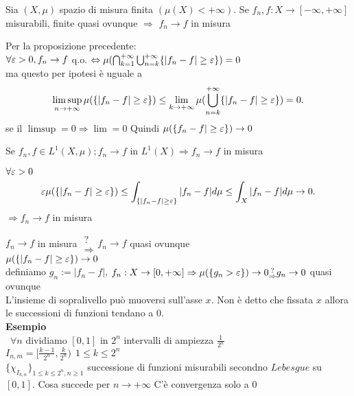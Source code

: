 \documentclass[12px]{article}
\begin{document}
		\begin{prop}
			Sia $(X,\mu)$ spazio di misura finita $(\mu(X) < +\infty)$. Se $f_n, f : X \rightarrow [-\infty, + \infty]$ misurabili, finite quasi ovunque $ \Rightarrow $ $f_n \rightarrow f$ in misura
		\end{prop}
		\begin{dimo}
			Per la proposizione precedente:\\ $\forall \varepsilon > 0 , f_n \rightarrow f$ q.o. $ \Leftrightarrow \mu( \bigcap^{+\infty}_{k = 1} \bigcup^{+\infty}_{n = k}\{|f_n-f|\geq\varepsilon\}) = 0$\\
			ma questo per ipotesi è uguale a
			\[
				\limsup_{n \rightarrow +\infty}\mu(\{|f_n-f|\geq\varepsilon\})\leq\lim_{ k \rightarrow+\infty }\mu( \bigcup^{+\infty}_{n = k} \{|f_n-f|\geq \varepsilon\}) = 0
			.\]  
			se il $\limsup = 0 \Rightarrow  \lim = 0$  Quindi $\mu(\{f_n-f|\geq \varepsilon\}) \rightarrow 0 $
		\end{dimo}
		\begin{prop}
			Se $f_n, f \in L^1(X,\mu); f_n \rightarrow f$ in $L^1(X) \Rightarrow  f_n \rightarrow f$ in misura
		\end{prop}
		\begin{dimo}
			$\forall \varepsilon > 0$
			\[
				
				\e\mu(\{|f_n-f|\geq\e\})\leq\int_{\{|f_n-f|\geq\e\}}|f_n-f|d\mu\leq\int_X|f_n-f| d\mu \rightarrow 0
			.\]
			$ \Rightarrow  f_n \rightarrow f$ in misura
		\end{dimo}
		$f_n \rightarrow f$ in misura $\substack{?\\ \Rightarrow }f_n \rightarrow f$ quasi ovunque\\
		$\mu(\{|f_n-f|\geq\varepsilon\}) \rightarrow 0$ \\
		definiamo $g_n := |f_n-f|$,  $f_n : X \rightarrow [0,+\infty] \Rightarrow \mu(\{g_n > \varepsilon\}) \rightarrow 0 \substack{?\\ \Rightarrow}  g_n \rightarrow 0 $ quasi ovunque\\
		L'insieme di sopralivello può muoversi sull'asse $x$. Non è detto che fissata $x$ allora le successioni di funzioni tendano a $0$.\\
		 \textbf{Esempio}\\\
		 $\forall n$ dividiamo  $[0,1] $ in  $2^n$ intervalli di ampiezza  $\frac{1}{2^n}$\\
		 $I_{n,m} = [\frac{k-1}{2^n},\frac{k}{2^n}) \ \ 1\leq k\leq 2^n$\\
		 $\{\chi_{I_{k,n}}\}_{1\leq k\leq 2^n, n\geq 1}$ successione di funzioni misurabili secondno $Lebesgue$ su  $[0,1]$. Cosa succede per  $ n \rightarrow +\infty$ C'è convergenza solo a $0$\\
\end{document}
